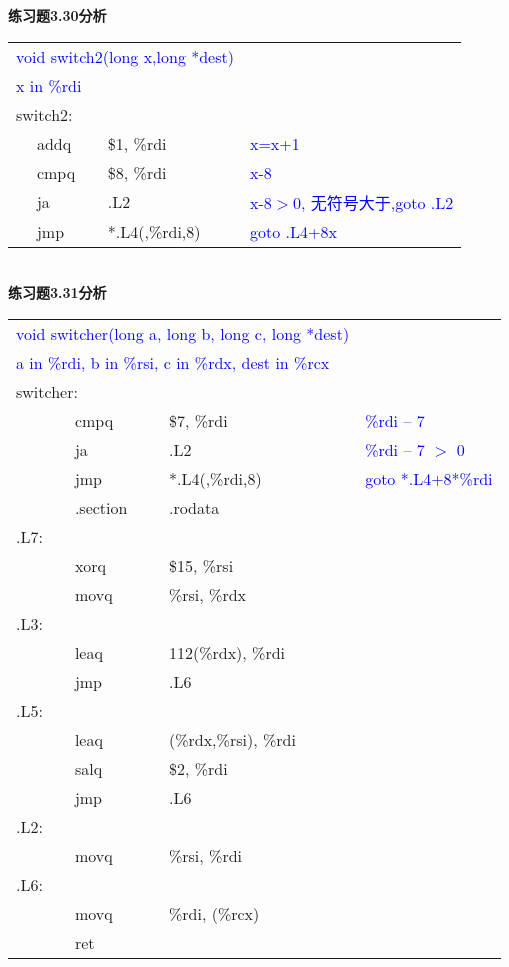 \documentclass{article}
\newcommand{\blue}[1]{\textcolor{blue}{#1}}
\begin{document}
\begin{CJK}{UTF8}{gbsn}
\newpage
\noindent\textbf{练习题3.30分析}	\\[-4ex]
\begin{table}[ht]
\begin{tabular}{m{2em}m{2em}m{8em}l}
	\multicolumn{3}{l}{\blue{ void switch2(long x,long *dest) }}	\\
	\multicolumn{3}{l}{\blue{x in \%rdi}}	\\
	\multicolumn{3}{l}{switch2:}	\\
	&	addq	&	\$1, \%rdi	&	\blue{ x=x+1 }	\\
	&	cmpq	&	\$8, \%rdi	&	\blue{x-8}	\\
	&	ja	&	.L2		&	\blue{\blue{x-8$>$0, 无符号大于,goto .L2}}	\\
	&	jmp	&	*.L4(,\%rdi,8)	&	\blue{goto .L4+8x}	\\
\end{tabular}
\end{table}	\\[-2ex]
\textbf{练习题3.31分析}	\\[-4ex]
\begin{table}[ht]
\begin{tabular}{m{2em}m{3em}m{8em}l}
	\multicolumn{3}{l}{\blue{void switcher(long a, long b, long c, long *dest)}}	\\
	\multicolumn{3}{l}{\blue{a in \%rdi, b in \%rsi, c in \%rdx, dest in \%rcx}}	\\
	\multicolumn{3}{l}{switcher:}	\\
	&	cmpq		&	\$7, \%rdi	&	\blue{\%rdi -- 7}	\\
	&	ja		&	.L2		&	\blue{\%rdi -- 7 $>$ 0}	\\
	&	jmp		&	*.L4(,\%rdi,8)	&	\blue{goto *.L4+8*\%rdi}	\\
	&	.section	&	.rodata		&	\blue{}	\\
.L7:	&			&			&	\blue{}	\\
	&	xorq		&	\$15, \%rsi	&	\blue{}	\\
	&	movq		&	\%rsi, \%rdx	&	\blue{}	\\
.L3:	&			&			&	\blue{}	\\
	&	leaq		&	112(\%rdx), \%rdi		&	\blue{}	\\
	&	jmp		&	.L6		&	\blue{}	\\
.L5:	&			&			&	\blue{}	\\
	&	leaq		&	(\%rdx,\%rsi), \%rdi		&	\blue{}	\\
	&	salq		&	\$2, \%rdi	&	\blue{}	\\
	&	jmp		&	.L6		&	\blue{}	\\
.L2:	&			&			&	\blue{}	\\
	&	movq		&	\%rsi, \%rdi	&	\blue{}	\\
.L6:	&			&			&	\blue{}	\\
	&	movq		&	\%rdi, (\%rcx)	&	\blue{}	\\
	&	ret		&			&	\blue{}	\\
\end{tabular}
\end{table}	\\[-2ex]


\end{CJK}
\end{document}
